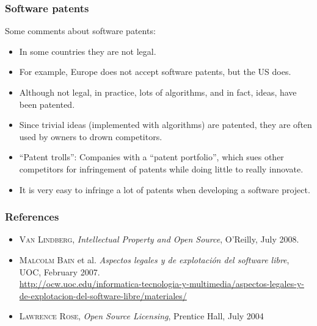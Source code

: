 
\begin{frame}
\frametitle{Software patents}

Some comments about software patents:
\begin{itemize}
\item In some countries they are not legal.
\item For example, Europe does not accept software patents, but
the US does.
\item Although not legal, in
  practice, lots of algorithms, and in fact, ideas, have been
  patented.
\item Since trivial ideas (implemented with algorithms) are patented,
  they are often used by owners to drown competitors.
\item ``Patent trolls'': Companies with a ``patent portfolio'', which
  sues other competitors  for infringement of patents while doing
  little to really innovate.
\item It is very easy to infringe a lot of patents when developing a
  software project.
\end{itemize}

\end{frame}



\begin{frame}
\frametitle{References}

\begin{itemize}
\item \textsc{Van Lindberg}, \textit{Intellectual Property and Open Source}, O'Reilly, July 2008.
\item \textsc{Malcolm Bain} et al. \textit{Aspectos legales y de explotación del software libre}, UOC, February 2007. \\
\url{http://ocw.uoc.edu/informatica-tecnologia-y-multimedia/aspectos-legales-y-de-explotacion-del-software-libre/materiales/}
\item \textsc{Lawrence Rose}, \textit{Open Source Licensing}, Prentice Hall, July 2004 
\end{itemize}

\end{frame}





